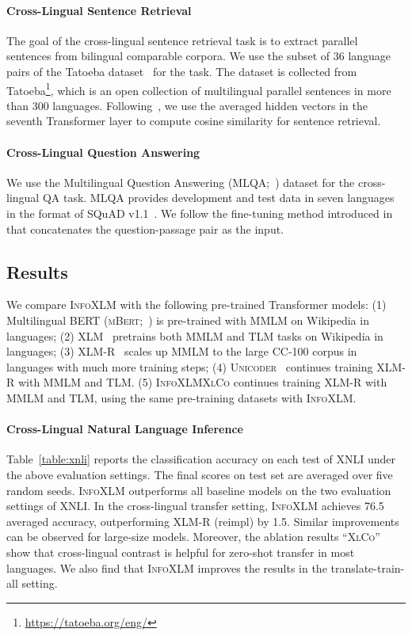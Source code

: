 \documentclass[11pt,a4paper]{article}
\newcommand\our{\textsc{InfoXLM}}
\newcommand\xlco{\textsc{XlCo}}
\begin{document}
\paragraph{Cross-Lingual Sentence Retrieval}
The goal of the cross-lingual sentence retrieval task is to extract parallel sentences from bilingual comparable corpora. 
We use the subset of 36 language pairs of the Tatoeba dataset~\cite{tatoeba} for the task.
The dataset is collected from Tatoeba\footnote{\url{https://tatoeba.org/eng/}},
which is an open collection of multilingual parallel sentences in more than 300 languages.
Following~\cite{xtreme}, we use the averaged hidden vectors in the seventh Transformer layer to compute cosine similarity for sentence retrieval.

\paragraph{Cross-Lingual Question Answering}
We use the Multilingual Question Answering (MLQA;~\citealt{mlqa}) dataset for the cross-lingual QA task. MLQA provides development and test data in seven languages in the format of SQuAD v1.1~\cite{squad1}.
We follow the fine-tuning method introduced in~\cite{bert} that concatenates the question-passage pair as the input.


\subsection{Results}
\label{sec:results}

We compare \our{} with the following pre-trained Transformer models:
(1) Multilingual BERT (\textsc{mBert};~\citealt{bert}) is pre-trained with MMLM on Wikipedia in  languages;
(2) \textsc{XLM}~\cite{xlm} pretrains both MMLM and TLM tasks on Wikipedia in  languages;
(3) \textsc{XLM-R}~\cite{xlmr} scales up MMLM to the large CC-100 corpus in  languages with much more training steps;
(4) \textsc{Unicoder}~\cite{xglue} continues training \textsc{XLM-R} with MMLM and TLM.
(5) \our{}\xlco{} continues training \textsc{XLM-R} with MMLM and TLM, using the same pre-training datasets with \our{}.

\paragraph{Cross-Lingual Natural Language Inference}
Table~\ref{table:xnli} reports the classification accuracy on each test of XNLI under the above evaluation settings.
The final scores on test set are averaged over five random seeds.
\our{} outperforms all baseline models on the two evaluation settings of XNLI.
In the cross-lingual transfer setting, \our{} achieves 76.5 averaged accuracy, outperforming XLM-R (reimpl) by 1.5.
Similar improvements can be observed for large-size models.
Moreover, the ablation results ``\xlco{}'' show that cross-lingual contrast is helpful for zero-shot transfer in most languages.
We also find that \our{} improves the results in the translate-train-all setting.
\end{document}
